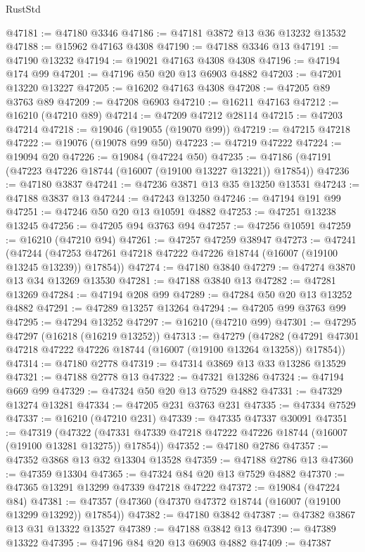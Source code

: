 \begin{lexlean}{RustStd}
\begin{coremodule}
@47181 := @47180 @3346
@47186 := @47181 @3872 @13 @36 @13232 @13532
@47188 := @15962 @47163 @4308
@47190 := @47188 @3346 @13
@47191 := @47190 @13232
@47194 := @19021 @47163 @4308 @4308
@47196 := @47194 @174 @99
@47201 := @47196 @50 @20 @13 @6903 @4882
@47203 := @47201 @13220 @13227
@47205 := @16202 @47163 @4308
@47208 := @47205 @89 @3763 @89
@47209 := @47208 @6903
@47210 := @16211 @47163
@47212 := @16210 (@47210 @89)
@47214 := @47209 @47212 @28114
@47215 := @47203 @47214
@47218 := @19046 (@19055 (@19070 @99))
@47219 := @47215 @47218
@47222 := @19076 (@19078 @99 @50)
@47223 := @47219 @47222
@47224 := @19094 @20
@47226 := @19084 (@47224 @50)
@47235 := @47186 (@47191 (@47223 @47226 @18744 (@16007 (@19100 @13227 @13221)) @17854))
@47236 := @47180 @3837
@47241 := @47236 @3871 @13 @35 @13250 @13531
@47243 := @47188 @3837 @13
@47244 := @47243 @13250
@47246 := @47194 @191 @99
@47251 := @47246 @50 @20 @13 @10591 @4882
@47253 := @47251 @13238 @13245
@47256 := @47205 @94 @3763 @94
@47257 := @47256 @10591
@47259 := @16210 (@47210 @94)
@47261 := @47257 @47259 @38947
@47273 := @47241
    (@47244 (@47253 @47261 @47218 @47222 @47226 @18744 (@16007 (@19100 @13245 @13239)) @17854))
@47274 := @47180 @3840
@47279 := @47274 @3870 @13 @34 @13269 @13530
@47281 := @47188 @3840 @13
@47282 := @47281 @13269
@47284 := @47194 @208 @99
@47289 := @47284 @50 @20 @13 @13252 @4882
@47291 := @47289 @13257 @13264
@47294 := @47205 @99 @3763 @99
@47295 := @47294 @13252
@47297 := @16210 (@47210 @99)
@47301 := @47295 @47297 (@16218 (@16219 @13252))
@47313 := @47279
    (@47282 (@47291 @47301 @47218 @47222 @47226 @18744 (@16007 (@19100 @13264 @13258)) @17854))
@47314 := @47180 @2778
@47319 := @47314 @3869 @13 @33 @13286 @13529
@47321 := @47188 @2778 @13
@47322 := @47321 @13286
@47324 := @47194 @669 @99
@47329 := @47324 @50 @20 @13 @7529 @4882
@47331 := @47329 @13274 @13281
@47334 := @47205 @231 @3763 @231
@47335 := @47334 @7529
@47337 := @16210 (@47210 @231)
@47339 := @47335 @47337 @30091
@47351 := @47319
    (@47322 (@47331 @47339 @47218 @47222 @47226 @18744 (@16007 (@19100 @13281 @13275)) @17854))
@47352 := @47180 @2786
@47357 := @47352 @3868 @13 @32 @13304 @13528
@47359 := @47188 @2786 @13
@47360 := @47359 @13304
@47365 := @47324 @84 @20 @13 @7529 @4882
@47370 := @47365 @13291 @13299 @47339 @47218 @47222
@47372 := @19084 (@47224 @84)
@47381 := @47357 (@47360 (@47370 @47372 @18744 (@16007 (@19100 @13299 @13292)) @17854))
@47382 := @47180 @3842
@47387 := @47382 @3867 @13 @31 @13322 @13527
@47389 := @47188 @3842 @13
@47390 := @47389 @13322
@47395 := @47196 @84 @20 @13 @6903 @4882
@47409 := @47387

\end{coremodule}
\end{lexlean}
